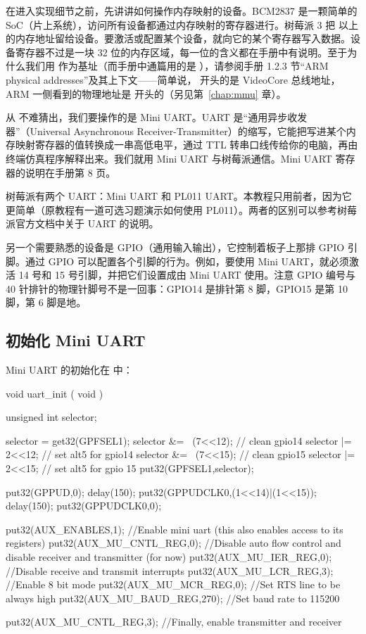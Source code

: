 在进入实现细节之前，先讲讲如何操作内存映射的设备。BCM2837 是一颗简单的 SoC（片上系统），访问所有设备都通过内存映射的寄存器进行。树莓派 3 把  以上的内存地址留给设备。要激活或配置某个设备，就向它的某个寄存器写入数据。设备寄存器不过是一块 32 位的内存区域，每一位的含义都在手册中有说明。至于为什么我们用  作为基址（而手册中通篇用的是 ），请参阅手册 1.2.3 节“ARM physical addresses”及其上下文——简单说， 开头的是 VideoCore 总线地址，ARM 一侧看到的物理地址是  开头的（另见第~\ref{chap:mmu} 章）。

从  不难猜出，我们要操作的是 Mini UART。UART 是“通用异步收发器”（Universal Asynchronous Receiver-Transmitter）的缩写，它能把写进某个内存映射寄存器的值转换成一串高低电平，通过 TTL 转串口线传给你的电脑，再由终端仿真程序解释出来。我们就用 Mini UART 与树莓派通信。Mini UART 寄存器的说明在手册第 8 页。

树莓派有两个 UART：Mini UART 和 PL011 UART。本教程只用前者，因为它更简单（原教程有一道可选习题演示如何使用 PL011）。两者的区别可以参考树莓派官方文档中关于 UART 的说明。

另一个需要熟悉的设备是 GPIO（通用输入输出），它控制着板子上那排 GPIO 引脚。通过 GPIO 可以配置各个引脚的行为。例如，要使用 Mini UART，就必须激活 14 号和 15 号引脚，并把它们设置成由 Mini UART 使用。注意 GPIO 编号与 40 针排针的物理针脚号不是一回事：GPIO14 是排针第 8 脚，GPIO15 是第 10 脚，第 6 脚是地。

\subsection{初始化 Mini UART}

Mini UART 的初始化在  中：

\begin{ccode}
void uart_init ( void )
{
	unsigned int selector;

	selector = get32(GPFSEL1);
	selector &= ~(7<<12);                   // clean gpio14
	selector |= 2<<12;                      // set alt5 for gpio14
	selector &= ~(7<<15);                   // clean gpio15
	selector |= 2<<15;                      // set alt5 for gpio 15
	put32(GPFSEL1,selector);

	put32(GPPUD,0);
	delay(150);
	put32(GPPUDCLK0,(1<<14)|(1<<15));
	delay(150);
	put32(GPPUDCLK0,0);

	put32(AUX_ENABLES,1);                   //Enable mini uart (this also enables access to its registers)
	put32(AUX_MU_CNTL_REG,0);               //Disable auto flow control and disable receiver and transmitter (for now)
	put32(AUX_MU_IER_REG,0);                //Disable receive and transmit interrupts
	put32(AUX_MU_LCR_REG,3);                //Enable 8 bit mode
	put32(AUX_MU_MCR_REG,0);                //Set RTS line to be always high
	put32(AUX_MU_BAUD_REG,270);             //Set baud rate to 115200

	put32(AUX_MU_CNTL_REG,3);               //Finally, enable transmitter and receiver
}
\end{ccode}

